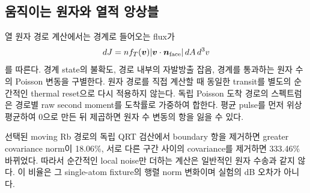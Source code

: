 \documentclass[11pt,a4paper]{article}
\begin{document}
\subsection{움직이는 원자와 열적 앙상블}
열 원자 경로 계산에서는 경계로 들어오는 flux가
\begin{equation}
 dJ=n f_T(\bm v)|\bm v\cdot\bm n_{\rm face}|\,dA\,d^3v
\end{equation}
를 따른다. 경계 state의 불확도, 경로 내부의 자발방출 잡음, 경계를
통과하는 원자 수의 Poisson 변동을 구별한다. 원자 경로를 직접 계산할 때
동일한 transit를 별도의 순간적인 thermal reset으로 다시 적용하지 않는다.
독립 Poisson 도착 경로의 스펙트럼은 경로별 raw second moment를 도착률로
가중하여 합한다. 평균 pulse를 먼저 위상 평균하여 0으로 만든 뒤
제곱하면 원자 수 변동의 항을 잃을 수 있다.

선택된 moving Rb 경로의 독립 QRT 검산에서 boundary 항을 제거하면
greater covariance norm이 18.06\%, 서로 다른 구간 사이의 covariance를
제거하면 333.46\% 바뀌었다. 따라서 순간적인 local noise만 더하는
계산은 일반적인 원자 수송과 같지 않다. 이 비율은 그 single-atom
fixture의 행렬 norm 변화이며 실험의 dB 오차가 아니다.
\end{document}
